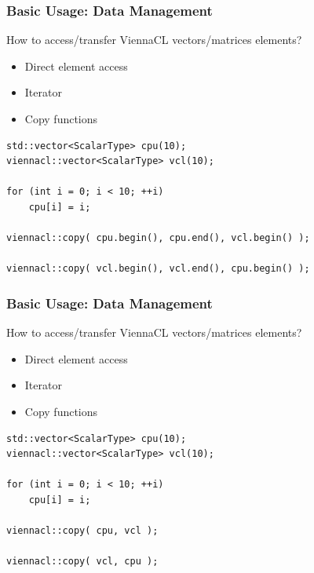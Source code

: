 \begin{frame}[fragile]
\frametitle{Basic Usage: Data Management}

\begin{block}{How to access/transfer ViennaCL vectors/matrices elements?}
  \begin{itemize}
   \item Direct element access
   \item Iterator
   \item Copy functions
  \end{itemize}
  
  \begin{lstlisting}
std::vector<ScalarType> cpu(10);
viennacl::vector<ScalarType> vcl(10);

for (int i = 0; i < 10; ++i)
    cpu[i] = i;
    
viennacl::copy( cpu.begin(), cpu.end(), vcl.begin() );

viennacl::copy( vcl.begin(), vcl.end(), cpu.begin() );
  \end{lstlisting}
\end{block}

\vspace{0.4cm}

\end{frame}



\begin{frame}[fragile]
\frametitle{Basic Usage: Data Management}

\begin{block}{How to access/transfer ViennaCL vectors/matrices elements?}
  \begin{itemize}
   \item Direct element access
   \item Iterator
   \item Copy functions
  \end{itemize}
  
  \begin{lstlisting}
std::vector<ScalarType> cpu(10);
viennacl::vector<ScalarType> vcl(10);

for (int i = 0; i < 10; ++i)
    cpu[i] = i;
    
viennacl::copy( cpu, vcl );

viennacl::copy( vcl, cpu );
  \end{lstlisting}
\end{block}

\vspace{0.4cm}

\end{frame}




